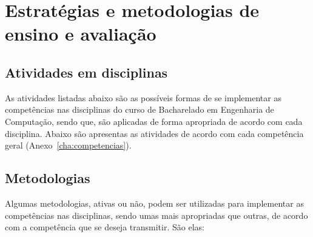 

\section{Estratégias e metodologias de ensino e avaliação}\label{sec:estrategias-e-metodologias-de-ensino-e-avaliacao}

\subsection{Atividades em disciplinas}\label{sec:atividades-em-disciplinas}


As atividades listadas abaixo são as possíveis formas de se implementar as competências nas disciplinas do curso de Bacharelado em Engenharia de Computação, sendo que, são aplicadas de forma apropriada de acordo com cada disciplina. Abaixo são apresentas as atividades de acordo com cada competência geral (Anexo~\ref{cha:competencias}).
                         



\subsection{Metodologias}\label{sec:metodologias}
Algumas metodologias, ativas ou não, podem ser utilizadas para implementar as competências nas disciplinas, sendo umas mais apropriadas que outras, de acordo com a competência que se deseja transmitir. São elas:

